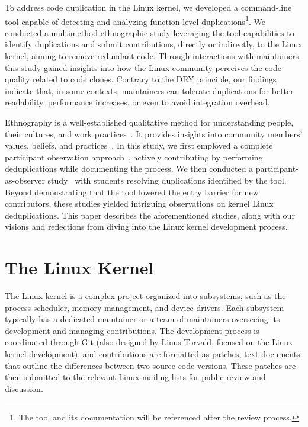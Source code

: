 \documentclass[10pt,conference]{IEEEtran}
\begin{document}
To address code duplication in the Linux kernel, we developed a command-line tool capable of detecting and analyzing function-level duplications\footnote{The tool and its documentation will be referenced after the review process.}. We conducted a multimethod ethnographic study leveraging the tool capabilities to identify duplications and submit contributions, directly or indirectly, to the Linux kernel, aiming to remove redundant code.
%
Through interactions with maintainers, this study gained insights into how the Linux community perceives the code quality related to code clones. Contrary to the DRY principle, our findings indicate that, in some contexts, maintainers can tolerate duplications for better readability, performance increases, or even to avoid integration overhead.

Ethnography is a well-established qualitative method for understanding people, their cultures, and work practices~\cite{bookethno}. It provides insights into community members' values, beliefs, and practices~\cite{ethnosoft}. In this study, we first employed a complete participant observation approach~\cite{gold1958roles}, actively contributing by performing deduplications while documenting the process. We then conducted a participant-as-observer study~\cite{gold1958roles} with students resolving duplications identified by the tool. Beyond demonstrating that the tool lowered the entry barrier for new contributors, these studies yielded intriguing observations on kernel Linux deduplications. This paper describes the aforementioned studies, along with our visions and reflections from diving into the Linux kernel development process.

\section{The Linux Kernel}

The Linux kernel is a complex project organized into subsystems, such as the process scheduler, memory management, and device drivers. Each subsystem typically has a dedicated maintainer or a team of maintainers overseeing its development and managing contributions. The development process is coordinated through Git (also designed by Linus Torvald, focused on the Linux kernel development), and contributions are formatted as patches, text documents that outline the differences between two source code versions. These patches are then submitted to the relevant Linux mailing lists for public review and discussion.
\end{document}
